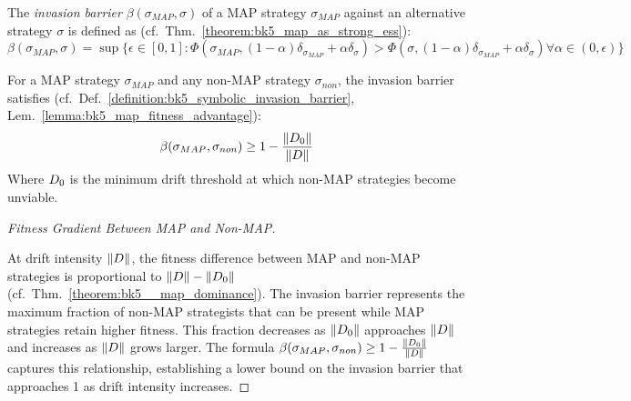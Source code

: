 \begin{definition} \label{definition:bk5_symbolic_invasion_barrier}
The \emph{invasion barrier} $\beta(\sigma_{MAP}, \sigma)$ of a MAP strategy $\sigma_{MAP}$ against an alternative strategy $\sigma$ is defined as (cf.~Thm.~\ref{theorem:bk5_map_as_strong_ess}):
\begin{equation}
\beta(\sigma_{MAP}, \sigma) = \sup\{\epsilon \in [0,1] : \Phi(\sigma_{MAP}, (1-\alpha)\delta_{\sigma_{MAP}} + \alpha\delta_{\sigma}) > \Phi(\sigma, (1-\alpha)\delta_{\sigma_{MAP}} + \alpha\delta_{\sigma}) \forall \alpha \in (0,\epsilon)\}
\end{equation}
\end{definition}
\begin{lemma} \label{lemma:bk5_map_invasion_barrier_strength}
For a MAP strategy $\sigma_{MAP}$ and any non-MAP strategy $\sigma_{non}$, the invasion barrier satisfies (cf.~Def.~\ref{definition:bk5_symbolic_invasion_barrier}, Lem.~\ref{lemma:bk5_map_fitness_advantage}):
\begin{equation}
\beta(\sigma_{MAP}, \sigma_{non}) \geq 1 - \frac{\|D_0\|}{\|D\|}
\end{equation}
Where $D_0$ is the minimum drift threshold at which non-MAP strategies become unviable.
\end{lemma}
\begin{proof}[Fitness Gradient Between MAP and Non-MAP]
\label{proof:bk5_map_vs_nonmap_gradient}
\leavevmode

At drift intensity $\|D\|$, the fitness difference between MAP and non-MAP strategies is proportional to $\|D\| - \|D_0\|$ (cf.~Thm.~\ref{theorem:bk5__map_dominance}).
The invasion barrier represents the maximum fraction of non-MAP strategists that can be present while MAP strategies retain higher fitness. This fraction decreases as $\|D_0\|$ approaches $\|D\|$ and increases as $\|D\|$ grows larger.
The formula $\beta(\sigma_{MAP}, \sigma_{non}) \geq 1 - \frac{\|D_0\|}{\|D\|}$ captures this relationship, establishing a lower bound on the invasion barrier that approaches 1 as drift intensity increases.
\end{proof}
